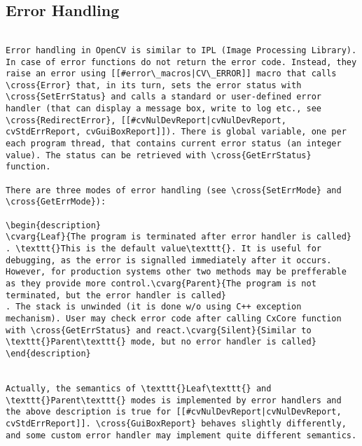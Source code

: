 \subsection{Error Handling}
\begin{verbatim}

Error handling in OpenCV is similar to IPL (Image Processing Library). In case of error functions do not return the error code. Instead, they raise an error using [[#error\_macros|CV\_ERROR]] macro that calls \cross{Error} that, in its turn, sets the error status with \cross{SetErrStatus} and calls a standard or user-defined error handler (that can display a message box, write to log etc., see \cross{RedirectError}, [[#cvNulDevReport|cvNulDevReport, cvStdErrReport, cvGuiBoxReport]]). There is global variable, one per each program thread, that contains current error status (an integer value). The status can be retrieved with \cross{GetErrStatus} function.

There are three modes of error handling (see \cross{SetErrMode} and \cross{GetErrMode}):

\begin{description}
\cvarg{Leaf}{The program is terminated after error handler is called}
. \texttt{}This is the default value\texttt{}. It is useful for debugging, as the error is signalled immediately after it occurs. However, for production systems other two methods may be prefferable as they provide more control.\cvarg{Parent}{The program is not terminated, but the error handler is called}
. The stack is unwinded (it is done w/o using C++ exception mechanism). User may check error code after calling CxCore function with \cross{GetErrStatus} and react.\cvarg{Silent}{Similar to \texttt{}Parent\texttt{} mode, but no error handler is called}
\end{description}


Actually, the semantics of \texttt{}Leaf\texttt{} and \texttt{}Parent\texttt{} modes is implemented by error handlers and the above description is true for [[#cvNulDevReport|cvNulDevReport, cvStdErrReport]]. \cross{GuiBoxReport} behaves slightly differently, and some custom error handler may implement quite different semantics.


\end{verbatim}
\label{ERROR Handling Macros}

